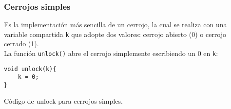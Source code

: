 \subsubsection{Cerrojos simples}
Es la implementación más sencilla de un cerrojo, la cual se realiza con una variable compartida \verb|k| que adopte dos valores: cerrojo abierto (0) o cerrojo cerrado (1).\\

La función \verb|unlock()| abre el cerrojo simplemente escribiendo un 0 en \verb|k|:
\begin{listing}[H]
\begin{verbatim}
void unlock(k){
    k = 0;
}
\end{verbatim}
\caption{Código de unlock para cerrojos simples.}
\label{unlock_cerrojos_simples}
\end{listing}


